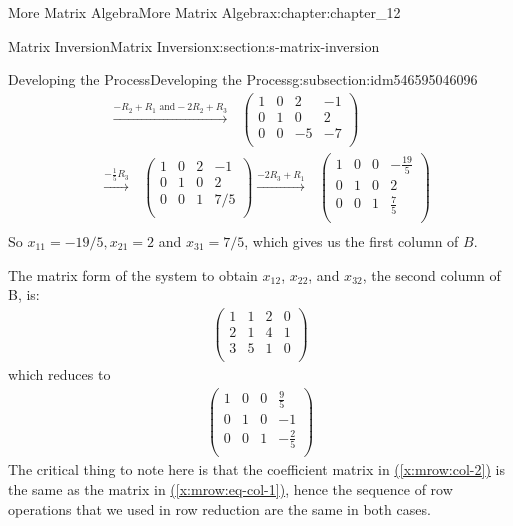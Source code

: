 \documentclass[oneside,10pt,]{book}
\newcommand{\xreffont}{\relax}
\numberwithin{equation}{section}
\begin{document}
\begin{chapterptx}{More Matrix Algebra}{}{More Matrix Algebra}{}{}{x:chapter:chapter_12}
\begin{sectionptx}{Matrix Inversion}{}{Matrix Inversion}{}{}{x:section:s-matrix-inversion}
\begin{subsectionptx}{Developing the Process}{}{Developing the Process}{}{}{g:subsection:idm546595046096}
\begin{equation*}
\begin{split}
& \textrm{  }\overset{-R_2+R_1\textrm{ and} -2R_2+R_3}{\longrightarrow }\textrm{    }\left(
\begin{array}{ccc|c}
1 & 0 & 2 & -1 \\
0 & 1 & 0 & 2 \\
0 & 0 & -5 & -7 \\
\end{array}
\right)\\
& \overset{-\frac{1}{5} R_3}{\longrightarrow }\textrm{      } \left(
\begin{array}{ccc|c}
1 & 0 & 2 & -1 \\
0 & 1 & 0 & 2 \\
0 & 0 & 1 & 7/5 \\
\end{array}
\right)\overset{-2 R_3+R_1}{\longrightarrow }\textrm{    }\left(
\begin{array}{ccc|c}
1 & 0 & 0 & -\frac{19}{5} \\
0 & 1 & 0 & 2 \\
0 & 0 & 1 & \frac{7}{5} \\
\end{array}
\right)\\
\end{split}
\end{equation*}
So \(x_{11}= -19/5, x_{21}=2\) and \(x_{31}=7/5\), which gives us the first column of  \(B\).%
\par
The matrix form of the system to obtain \(x_{12}\), \(x_{22}\), and \(x_{32}\), the second column of B, is:%
\begin{align}
\left(
\begin{array}{ccc|c}
1 & 1 & 2 & 0 \\
2 & 1 & 4 & 1 \\
3 & 5 & 1 & 0 \\
\end{array}
\right)\label{x:mrow:col-2}
\end{align}
which reduces to%
\begin{align}
\left(
\begin{array}{ccc|c}
1 & 0 & 0 & \frac{9}{5} \\
0 & 1 & 0 & -1 \\
0 & 0 & 1 & -\frac{2}{5} \\
\end{array}
\right)\label{x:mrow:col-2-inverse}
\end{align}
The critical thing to note here is that the coefficient matrix in \hyperref[x:mrow:col-2]{({\xreffont\ref{x:mrow:col-2}})} is the same as the matrix in \hyperref[x:mrow:eq-col-1]{({\xreffont\ref{x:mrow:eq-col-1}})}, hence the sequence of row operations that we used in row reduction are the same in both cases.%

\end{subsectionptx}
\end{sectionptx}
\end{chapterptx}
\end{document}
